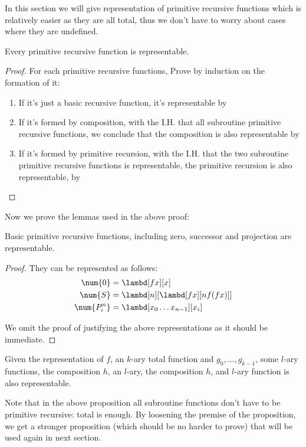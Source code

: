 \documentclass[../../../include/open-logic-section]{subfiles}
\begin{document}

In this section we will give representation of primitive recursive
functions which is relatively easier as they are all total, thus we don't have to worry about cases where they are
undefined.

\begin{prop}
  Every primitive recursive function is representable.
\end{prop}
\begin{proof}
  For each primitive recursive functions, Prove by induction on
  the formation of it:
  \begin{enumerate}
  \item If it's just a basic recursive function, it's representable by
  \item If it's formed by composition, with the I.H. that all
    subroutine primitive recursive functions, we
    conclude that the composition is also representable by
  \item If it's formed by primitive recursion, with the I.H. that the
    two subroutine primitive recursive functions is representable, the
    primitive recursion is also representable, by 
  \end{enumerate}
\end{proof}

Now we prove the lemmas used in the above proof:

\begin{lem}
  Basic primitive recursive functions, including zero, successor and
  projection are representable.
\end{lem}
\begin{proof}
  They can be represented as follows:
  \begin{align*}
    \num{0} &= \lambd[fx][x]\\
    \num{S} &= \lambd[n][\lambd[fx][n f (f x)]] \\
    \num{P^n_i} &= \lambd[x_0\dots x_{n-1}][x_i] \\
  \end{align*}

  We omit the proof of justifying the above representations as it should
  be immediate.
\end{proof}

\begin{lem}
  Given the representation of $f$, an $k$-ary total function and $g_0,
  \dots, g_{k-1}$, some $l$-ary functions, the composition $h$, an
  $l$-ary, the composition $h$, and $l$-ary function is also representable.
\end{lem}
Note that in the above proposition all subroutine functions don't have
to be primitive recursive: total is enough. By loosening the premise
of the proposition, we get a stronger proposition (which should be no harder
to prove) that will be used again in next section.
\end{document}
